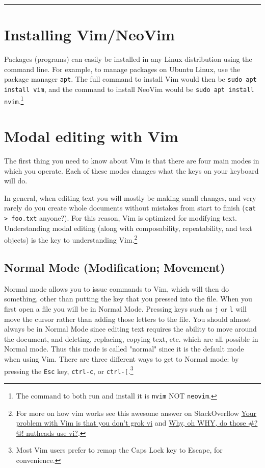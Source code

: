 \documentclass[11pt]{article}
\begin{document}
\noindent\rule{\textwidth}{0.5pt}

\newpage

\section{Installing Vim/NeoVim}
\label{sec:org68fc9d8}
Packages (programs) can easily be installed in any Linux distribution using the
command line. For example, to manage packages on Ubuntu Linux, use the package
manager \texttt{apt}. The full command to install Vim would then be \texttt{sudo apt install
vim}, and the command to install NeoVim would be \texttt{sudo apt install nvim}.\footnote{The command to both run and install it is \texttt{nvim} NOT \texttt{neovim}.}
\section{Modal editing with Vim}
\label{sec:orgfce45e4}
The first thing you need to know about Vim is that there are four main modes in
which you operate. Each of these modes changes what the keys on your keyboard
will do.

In general, when editing text you will mostly be making small changes, and very
rarely do you create whole documents without mistakes from start to finish (\texttt{cat
> foo.txt} anyone?). For this reason, Vim is optimized for modifying text.
Understanding modal editing (along with composability, repeatability, and text
objects) is the key to understanding Vim.\footnote{For more on how vim works see this awesome answer on StackOverflow
\href{https://stackoverflow.com/questions/1218390/what-is-your-most-productive-shortcut-with-vim}{Your problem with Vim is that you don't grok vi} and \href{http://www.viemu.com/a-why-vi-vim.html}{Why, oh WHY, do those \#?@!
nutheads use vi?}.}
\subsection{Normal Mode (Modification; Movement)}
\label{sec:orgd3ea1de}
Normal mode allows you to issue commands to Vim, which will then do something,
other than putting the key that you pressed into the file. When you first open a
file you will be in Normal Mode. Pressing keys such as \texttt{j} or \texttt{l} will move the
cursor rather than adding those letters to the file. You should almost always be
in Normal Mode since editing text requires the ability to move around the
document, and deleting, replacing, copying text, etc. which are all possible in
Normal mode. Thus this mode is called "normal" since it is the default mode when
using Vim. There are three different ways to get to Normal mode: by pressing
the \texttt{Esc} key, \texttt{ctrl-c}, or \texttt{ctrl-[}.\footnote{Most Vim users prefer to remap the Caps Lock key to Escape, for 
convenience.} 
\end{document}
